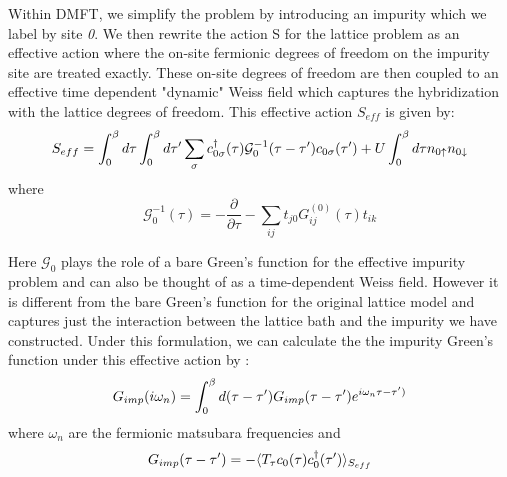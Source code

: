 \documentclass[10pt]{ruthesis}
\begin{document}
Within DMFT, we simplify the problem by introducing an impurity which we label by site \textit{0}. We then rewrite the action S for the lattice problem as an effective action where the on-site fermionic degrees of freedom on the impurity site are treated exactly. These on-site degrees of freedom are then coupled to an effective time dependent "dynamic" Weiss field which captures the hybridization with the lattice degrees of freedom.  This effective action $S_{eff}$ is given by:
\begin{equation} \label{S_eff}
 S_{eff}= \int_{0}^{\beta} d\tau \int_{0}^{\beta} d \tau' \sum_{\sigma} c^{\dagger}_{0\sigma}(\tau) \mathcal{G}_{0}^{-1}(\tau -\tau') c_{0\sigma}(\tau') +U \int_{0}^{\beta} d\tau n_{0\uparrow} n_{0 \downarrow}
 \end{equation} 
where 
 \begin{equation}\label{G0_imp}
  \mathcal{G}_{0}^{-1}(\tau)= -\dfrac{\partial} {\partial \tau} -\sum_{ij} t_{j0} G^{(0)} _{ij} (\tau) t_{ik}
 \end{equation} 
  
Here $\mathcal{G}_0$ plays the role of a bare Green's function for the effective impurity problem and can also be thought of as a time-dependent Weiss field. However it is different from the bare Green's function for the original lattice model and captures just the interaction between the lattice bath and the impurity we have constructed. Under this formulation, we can calculate the the impurity Green's function under this effective action by :
\begin{equation}
G_{imp}(i \omega_n)=\int_{0}^{\beta} d(\tau - \tau') G_{imp}(\tau - \tau') e^{i\omega_n \tau - \tau') }
\end{equation}
where $\omega_n$ are the fermionic matsubara frequencies and
\begin{equation}
G_{imp}(\tau - \tau')= - \langle T_{\tau} c_0(\tau) c^{\dagger}_0(\tau') \rangle _{S_{eff}}
\end{equation}
\end{document}
